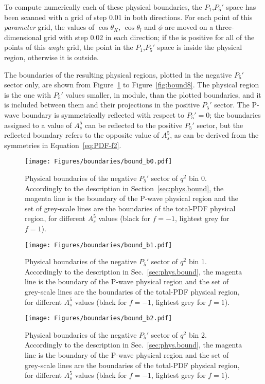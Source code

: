 To compute numerically each of these physical boundaries, the $P_1$,$P_5'$ space has been scanned with a grid of step 0.01 in both directions.
For each point of this \textit{parameter} grid, the values of $\cos\theta_K$, $\cos\theta_l$ and $\phi$ are moved on a three-dimensional grid with step 0.02 in each direction; if the \pdf is positive for all of the points of this \textit{angle} grid, the point in the $P_1$,$P_5'$ space is inside the physical region, otherwise it is outside.

The boundaries of the resulting physical regions, plotted in the negative $P_5'$ sector only, are shown from Figure~\ref{fig:bound0} to Figure~\ref{fig:bound8}.
The physical region is the one with $P_5'$ values smaller, in module, than the plotted boundaries, and it is included between them and their projections in the positive $P_5'$ sector. 
The P-wave boundary is symmetrically reflected with respect to $P_5'=0$; the boundaries assigned to a value of $A_s^5$ can be reflected to the positive $P_5'$ sector, but the reflected boundary refers to the opposite value of $A_s^5$, as can be derived from the symmetries in Equation~\ref{eq:PDF-f2}.

\begin{figure}[!hbt]
  \centering
  \texttt{[image: Figures/boundaries/bound\_b0.pdf]}
  \caption{Physical boundaries of the negative $P_5'$ sector of $q^2$ bin 0.
    Accordingly to the description in Section~\ref{sec:phys.bound}, the magenta line is the boundary of the P-wave physical region and the set of grey-scale lines are the boundaries of the total-PDF physical region, for different $A_s^5$ values (black for $f=-1$, lightest grey for $f=1$).}
  \label{fig:bound0}
\end{figure}

\begin{figure}[!hbt]
  \centering
  \texttt{[image: Figures/boundaries/bound\_b1.pdf]}
  \caption{Physical boundaries of the negative $P_5'$ sector of $q^2$ bin 1. Accordingly to the description in Sec.~\ref{sec:phys.bound}, the magenta line is the boundary of the P-wave physical region and the set of grey-scale lines are the boundaries of the total-PDF physical region, for different $A_s^5$ values (black for $f=-1$, lightest grey for $f=1$).}
  \label{fig:bound1}
\end{figure}

\begin{figure}[!hbt]
  \centering
  \texttt{[image: Figures/boundaries/bound\_b2.pdf]}
  \caption{Physical boundaries of the negative $P_5'$ sector of $q^2$ bin 2. Accordingly to the description in Sec.~\ref{sec:phys.bound}, the magenta line is the boundary of the P-wave physical region and the set of grey-scale lines are the boundaries of the total-PDF physical region, for different $A_s^5$ values (black for $f=-1$, lightest grey for $f=1$).}
  \label{fig:bound2}
\end{figure}

